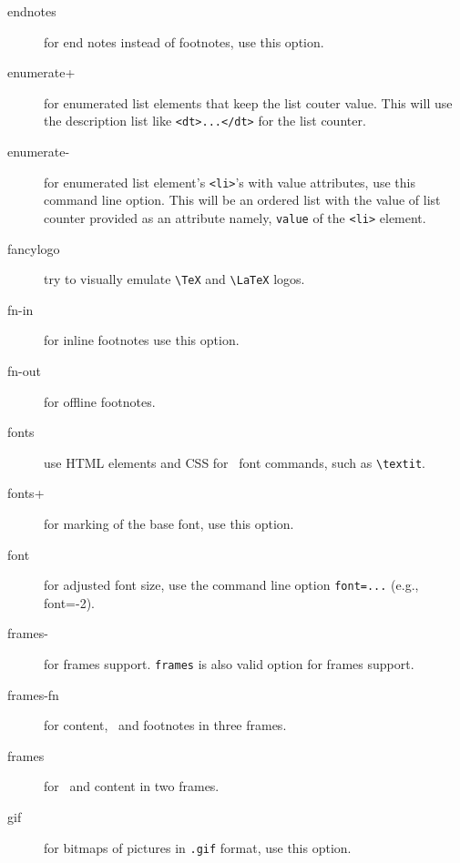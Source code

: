 \begin{description}

\item[endnotes] for end notes instead of footnotes, use this option.


\item[enumerate+] for enumerated list elements that keep the list couter value. This
  will use the description list like \verb=<dt>...</dt>= for the list
  counter.

\item[enumerate-] for enumerated list element's \verb=<li>='s with
  value attributes, use this command line option. This will be an
  ordered list with the value of list counter provided as an attribute
  namely, \verb=value= of the \verb=<li>= element.

\item[fancylogo] try to visually emulate \verb|\TeX| and \verb|\LaTeX| logos.

\item[fn-in] for inline footnotes use this option.

\item[fn-out] for offline footnotes.

\item[fonts] use HTML elements and CSS for \latex\ font commands, such as
  \verb|\textit|.

\item[fonts+] for marking of the base font, use this option.

\item[font] for adjusted font size, use the command line option
  \verb+font=...+ (e.g., font=-2).

\item[frames-] for frames support. \verb=frames= is also valid option
  for frames support.

\item[frames-fn] for content, \ and footnotes in
  three frames.

\item[frames] for \ and content in two frames.


\item[gif] for bitmaps of pictures in \verb=.gif= format, use this
  option.


\end{description}
